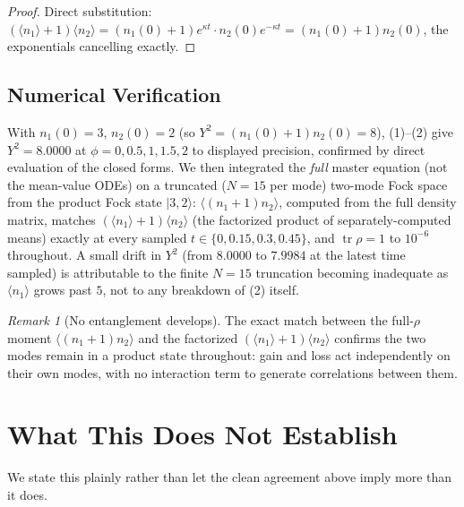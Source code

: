 \documentclass[12pt]{amsart}
\theoremstyle{plain}
\theoremstyle{remark}
\newtheorem*{remark}{Remark}
\begin{document}
\begin{proof}
Direct substitution: $(\langle n_1\rangle+1)\langle n_2\rangle=(n_1(0)+1)e^{\kappa t}\cdot n_2(0)e^{-\kappa t}=(n_1(0)+1)n_2(0)$, the exponentials cancelling exactly.
\end{proof}

\subsection*{Numerical Verification}
With $n_1(0)=3$, $n_2(0)=2$ (so $Y^2=(n_1(0)+1)n_2(0)=8$), (1)--(2) give $Y^2=8.0000$ at $\phi=0,0.5,1,1.5,2$ to displayed precision, confirmed by direct evaluation of the closed forms. We then integrated the \emph{full} master equation (not the mean-value ODEs) on a truncated ($N=15$ per mode) two-mode Fock space from the product Fock state $|3,2\rangle$: $\langle(n_1+1)n_2\rangle$, computed from the full density matrix, matches $(\langle n_1\rangle+1)\langle n_2\rangle$ (the factorized product of separately-computed means) exactly at every sampled $t\in\{0,0.15,0.3,0.45\}$, and $\operatorname{tr}\rho=1$ to $10^{-6}$ throughout. A small drift in $Y^2$ (from $8.0000$ to $7.9984$ at the latest time sampled) is attributable to the finite $N=15$ truncation becoming inadequate as $\langle n_1\rangle$ grows past $5$, not to any breakdown of (2) itself.

\begin{remark}[No entanglement develops]
The exact match between the full-$\rho$ moment $\langle(n_1+1)n_2\rangle$ and the factorized $(\langle n_1\rangle+1)\langle n_2\rangle$ confirms the two modes remain in a product state throughout: gain and loss act independently on their own modes, with no interaction term to generate correlations between them.
\end{remark}

\section{What This Does Not Establish}

We state this plainly rather than let the clean agreement above imply more than it does.
\end{document}
